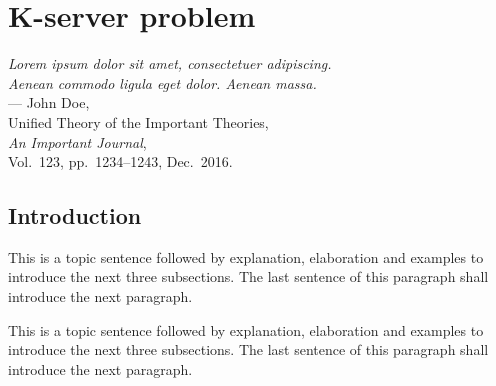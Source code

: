 

%
%
\chapter{K-server problem}
\label{ch:appendixTwo}

\begin{flushright}
{\slshape Lorem ipsum dolor sit amet, consectetuer adipiscing.}\\
{\slshape Aenean commodo ligula eget dolor. Aenean massa.}\\
\medskip
--- John Doe,\\
Unified Theory of the Important Theories,\\
{\slshape An Important Journal},\\
Vol.~123, pp.~1234--1243, Dec.~2016.\\
\end{flushright}

\bigskip


\section{Introduction}
\label{sec:ch_1_introduction}

This is a topic sentence followed by explanation, elaboration and examples to introduce the next three subsections. The last sentence of this paragraph shall introduce the next paragraph. \lipsum[1]

This is a topic sentence followed by explanation, elaboration and examples to introduce the next three subsections. The last sentence of this paragraph shall introduce the next paragraph. \lipsum[1]

